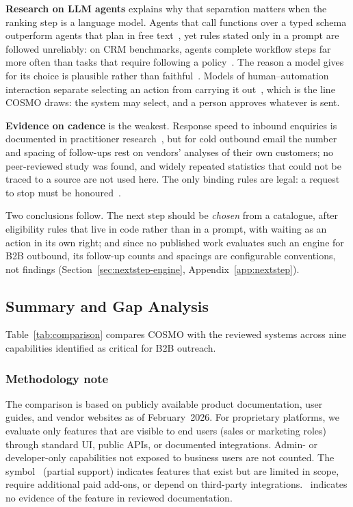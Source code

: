 \documentclass[a4paper]{article}
\newcommand{\halfcimark}{\LEFTcircle}
\newcommand{\nocimark}{\Circle}
\begin{document}
\textbf{Research on LLM agents} explains why that separation matters when
the ranking step is a language model. Agents that call functions over a
typed schema outperform agents that plan in free
text~\cite{yao2024taubench, huang2025crmarena}, yet rules stated only in a
prompt are followed unreliably: on CRM benchmarks, agents complete workflow
steps far more often than tasks that require following a
policy~\cite{huang2025crmarenapro}. The reason a model gives for its choice
is plausible rather than faithful~\cite{turpin2023unfaithful}. Models of
human--automation interaction separate selecting an action from carrying it
out~\cite{parasuraman2000automation}, which is the line COSMO draws: the
system may select, and a person approves whatever is sent.

\textbf{Evidence on cadence} is the weakest. Response speed to inbound
enquiries is documented in practitioner
research~\cite{oldroyd2011shortlife}, but for cold outbound email the number
and spacing of follow-ups rest on vendors' analyses of their own customers;
no peer-reviewed study was found, and widely repeated statistics that could
not be traced to a source are not used here. The only binding rules are
legal: a request to stop must be
honoured~\cite{ftc_canspam, gdpr_art21, vn_decree91}.

Two conclusions follow. The next step should be \emph{chosen} from a
catalogue, after eligibility rules that live in code rather than in a prompt,
with waiting as an action in its own right; and since no published work
evaluates such an engine for B2B outbound, its follow-up counts and spacings
are configurable conventions, not findings
(Section~\ref{sec:nextstep-engine}, Appendix~\ref{app:nextstep}).

\subsection{Summary and Gap Analysis}

Table~\ref{tab:comparison} compares COSMO with the reviewed systems 
across nine capabilities identified as critical for B2B outreach.

\subsubsection{Methodology note}
The comparison is based on publicly available product documentation, 
user guides, and vendor websites as of February~2026. For proprietary 
platforms, we evaluate only features that are visible to end users 
(sales or marketing roles) through standard UI, public APIs, or 
documented integrations. Admin- or developer-only capabilities not 
exposed to business users are not counted. The symbol \halfcimark\ 
(partial support) indicates features that exist but are limited in 
scope, require additional paid add-ons, or depend on third-party 
integrations. \nocimark\ indicates no evidence of the feature in 
reviewed documentation.
\end{document}

